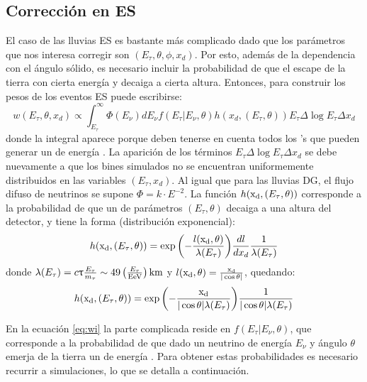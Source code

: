 		\subsection{Corrección en ES}
		\label{sbsc:corrES}
		El caso de las lluvias ES es bastante más complicado dado que los parámetros que nos interesa corregir son $(E_\tau,\theta,\phi,x_d)$.
		Por esto, además de la dependencia con el ángulo sólido, es necesario incluir la probabilidad de que el \tauon{} escape de la tierra con cierta energía y decaiga a cierta altura.
		Entonces, para construir los pesos de los eventos ES puede escribirse:
		\begin{equation}
		 w(E_\tau,\theta,x_d) \propto \int_{E_\tau}^\infty \Phi(E_\nu)dE_\nu f(E_\tau|E_\nu,\theta) h(x_d,(E_\tau,\theta)) E_\tau \Delta\log E_\tau \Delta x_d
		 \label{eq:wi}
		\end{equation}
		donde la integral aparece porque deben tenerse en cuenta todos los \nutau{}'s que pueden generar un \tauon{} de energía \etau{}.
		La aparición de los términos $E_\tau \Delta\log E_\tau \Delta x_d$ se debe nuevamente a que los bines simulados no se encuentran uniformemente distribuidos en las variables $(E_\tau,x_d)$.
		Al igual que para las lluvias DG, el flujo difuso de neutrinos se supone $\Phi=k\cdot E^{-2}$.
		La función $h({\rm x_d},(E_\tau,\theta))$ corresponde a la probabilidad de que un \tauon{} de parámetros $(E_\tau,\theta)$ decaiga a una altura \xd{} del detector, y tiene la forma (distribuci\'on exponencial):
		\begin{equation}
		 h({\rm x_d},(E_\tau,\theta))=
		 \exp{\left(
		 -\frac{l({\rm x_d},\theta)}{\lambda(E_\tau)}
		 \right)}
		 \frac{dl}{dx_d}\frac{1}{\lambda(E_\tau)}
		\end{equation}
		donde $\lambda(E_\tau)=c\uptau\frac{E_\tau}{m_\tau}\sim49\left(\frac{E_\tau}{\rm EeV}\right){\rm km}$ y $l({\rm x_d},\theta)=\frac{{\rm x_d}}{|\cos\theta|}$, quedando:
		\begin{equation}
		 h({\rm x_d},(E_\tau,\theta))=
		 \exp{\left(
		 -\frac{{\rm x_d}}{|\cos\theta|\lambda(E_\tau)}
		 \right)}
		 \frac{1}{|\cos\theta|\lambda(E_\tau)}
		 \label{eq:ptaudecay}
		\end{equation}
		
		En la ecuación \ref{eq:wi} la parte complicada reside en $f(E_\tau|E_\nu,\theta)$, que corresponde a la probabilidad de que dado un neutrino de energía $E_\nu$ y ángulo $\theta$ emerja de la tierra un \tauon{} de energía \etau{}.
		Para obtener estas probabilidades es necesario recurrir a simulaciones, lo que se detalla a continuación.
		

